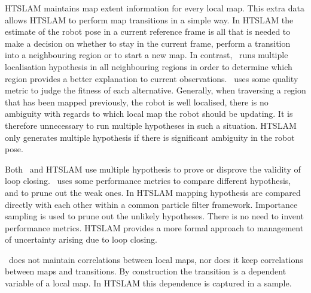 
HTSLAM maintains map extent information for every local map. This extra
data allows HTSLAM to perform map transitions in a simple way. In HTSLAM
the estimate of the robot pose in a current reference frame is all that
is needed to make a decision on whether to stay in the current frame,
perform a transition into a neighbouring region or to start a new
map. In contrast, \Atlas\ runs multiple localisation hypothesis in all
neighbouring regions in order to determine which region provides a
better explanation to current observations. \Atlas\ uses some quality
metric to judge the fitness of each alternative. Generally, when
traversing a region that has been mapped previously, the robot is well
localised, there is no ambiguity with regards to which local map
the robot should be updating. It is therefore unnecessary to run
multiple hypotheses in such a situation. HTSLAM only generates multiple
hypothesis if there is significant ambiguity in the robot pose.


Both \Atlas\ and HTSLAM use multiple hypothesis to prove or disprove the
validity of loop closing. \Atlas\ uses some performance metrics to
compare different hypothesis, and to prune out the weak ones. In HTSLAM
mapping hypothesis are compared directly with each other within a common
particle filter framework. Importance sampling is used to prune out the
unlikely hypotheses. There is no need to invent performance
metrics. HTSLAM provides a more formal approach to management of
uncertainty arising due to loop closing.



\Atlas\ does not maintain correlations between local maps, nor does it
keep correlations between maps and transitions. By construction the
transition is a dependent variable of a local map. In HTSLAM this
dependence is captured in a sample.





